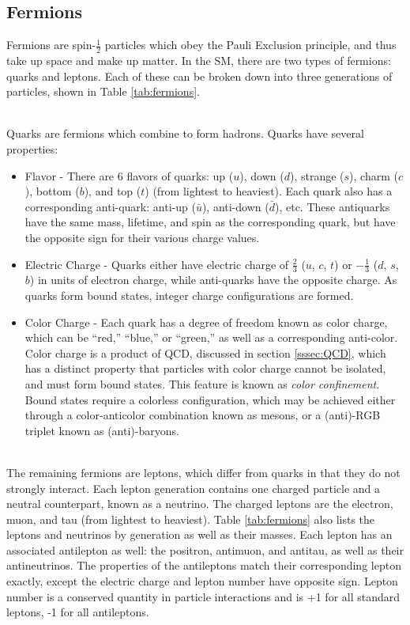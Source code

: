         \subsection{Fermions} \label{ssec:fermions}
        Fermions are spin-$\frac{1}{2}$ particles which obey the Pauli Exclusion principle, and thus take up space and make up matter. In the \gls{SM}, there are two types of fermions: quarks and leptons. Each of these can be broken down into three generations of particles, shown in Table \ref{tab:fermions}.

        \\
        \indent Quarks are fermions which combine to form hadrons. Quarks have several properties:
        \begin{itemize}
            \item Flavor - There are 6 flavors of quarks: up ($u$), down ($d$), strange ($s$), charm ($c$), bottom ($b$), and top ($t$) (from lightest to heaviest). Each quark also has a corresponding anti-quark: anti-up ($\bar{u}$), anti-down ($\bar{d}$), etc. These antiquarks have the same mass, lifetime, and spin as the corresponding quark, but have the opposite sign for their various charge values.
            \item Electric Charge - Quarks either have electric charge of $\frac{2}{3}$ ($u$, $c$, $t$) or $-\frac{1}{3}$ ($d$, $s$, $b$) in units of electron charge, while anti-quarks have the opposite charge. As quarks form bound states, integer charge configurations are formed.
            \item Color Charge - Each quark has a degree of freedom known as color charge, which can be ``red,'' ``blue,'' or ``green,'' as well as a corresponding anti-color. Color charge is a product of \gls{QCD}, discussed in section \ref{sssec:QCD}, which has a distinct property that particles with color charge cannot be isolated, and must form bound states. This feature is known as \textit{color confinement}. Bound states require a colorless configuration, which may be achieved either through a color-anticolor combination known as mesons, or a (anti)-RGB triplet known as (anti)-baryons. 
        \end{itemize}

        \\
        \indent The remaining fermions are leptons, which differ from quarks in that they do not strongly interact. Each lepton generation contains one charged particle and a neutral counterpart, known as a neutrino. The charged leptons are the electron, muon, and tau (from lightest to heaviest). Table \ref{tab:fermions} also lists the leptons and neutrinos by generation as well as their masses. Each lepton has an associated antilepton as well: the positron, antimuon, and antitau, as well as their antineutrinos. The properties of the antileptons match their corresponding lepton exactly, except the electric charge and lepton number have opposite sign. Lepton number is a conserved quantity in particle interactions and is +1 for all standard leptons, -1 for all antileptons.

